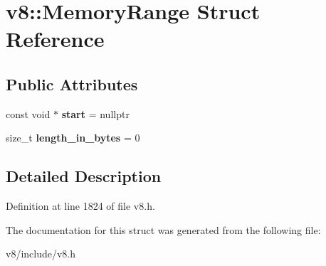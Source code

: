 \hypertarget{structv8_1_1MemoryRange}{}\section{v8\+:\+:Memory\+Range Struct Reference}
\label{structv8_1_1MemoryRange}
\subsection*{Public Attributes}
\begin{DoxyCompactItemize}
\item 
\mbox{\label{structv8_1_1MemoryRange_a3dea80a77e98bb0b9ff20fa27cb13280}} 
const void $\ast$ {\bfseries start} = nullptr
\item 
\mbox{\label{structv8_1_1MemoryRange_a03b4862f20703ce8b94c30850451b870}} 
size\+\_\+t {\bfseries length\+\_\+in\+\_\+bytes} = 0
\end{DoxyCompactItemize}


\subsection{Detailed Description}


Definition at line 1824 of file v8.\+h.



The documentation for this struct was generated from the following file\+:\begin{DoxyCompactItemize}
\item 
v8/include/v8.\+h\end{DoxyCompactItemize}
